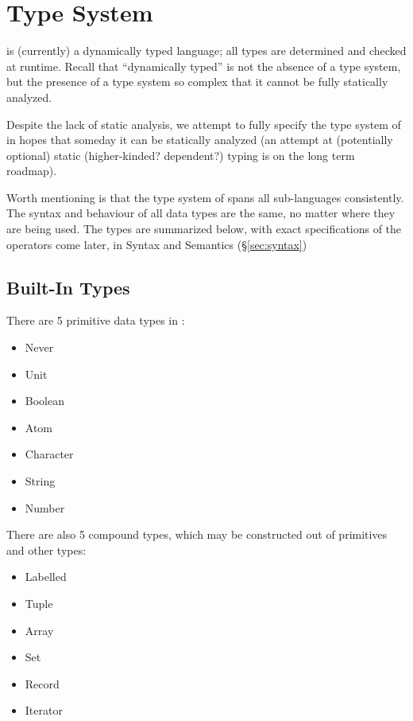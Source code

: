 \section{Type System}

\Trilogy{} is (currently) a dynamically typed language; all types are determined
and checked at runtime. Recall that ``dynamically typed'' is not the absence of
a type system, but the presence of a type system so complex that it cannot be
fully statically analyzed.

Despite the lack of static analysis, we attempt to fully specify the type system
of \Trilogy{} in hopes that someday it can be statically analyzed (an attempt at
(potentially optional) static (higher-kinded? dependent?) typing is on the long
term roadmap).

Worth mentioning is that the type system of \Trilogy{} spans all sub-languages
consistently. The syntax and behaviour of all data types are the same, no matter
where they are being used. The types are summarized below, with exact specifications
of the operators come later, in Syntax and Semantics (\S\ref{sec:syntax})

\subsection{Built-In Types}

There are 5 primitive data types in \Trilogy{}:

\begin{itemize}
    \item Never
    \item Unit
    \item Boolean
    \item Atom
    \item Character
    \item String
    \item Number
\end{itemize}

\noindent
There are also 5 compound types, which may be constructed out of primitives
and other types:

\begin{itemize}
    \item Labelled
    \item Tuple
    \item Array
    \item Set
    \item Record
    \item Iterator
\end{itemize}

